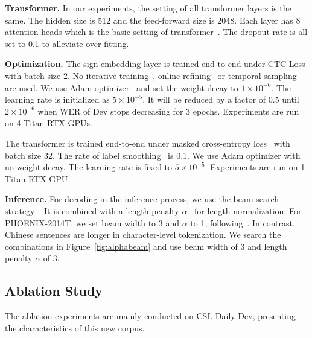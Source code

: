 \documentclass[final]{cvpr}
\begin{document}
\textbf{Transformer.}
In our experiments, the setting of all transformer layers is the same. 
The hidden size is 512 and the feed-forward size is 2048. 
Each layer has 8 attention heads which is the basic setting of transformer~\cite{vaswani2017attention}. 
The dropout rate is all set to 0.1 to alleviate over-fitting. 

\textbf{Optimization.}
The sign embedding layer is trained end-to-end under CTC Loss with batch size 2. 
No iterative training~\cite{DPD_icme19}, online refining~\cite{cslr-fcn-20fully} or temporal sampling~\cite{cslr-20-Stochastic} are used. 
We use Adam optimizer~\cite{adam} and set the weight decay to $1\times10^{-6}$. 
The learning rate is initialized as $5\times10^{-5}$. 
It will be reduced by a factor of 0.5 until $2\times10^{-6}$ when WER of Dev stops decreasing for 3 epochs. 
Experiments are run on 4 Titan RTX GPUs. 

The transformer is trained end-to-end under masked cross-entropy loss~\cite{trans-vaswani17attention} with batch size 32. 
The rate of label smoothing~\cite{labelsmooth,trans-vaswani17attention} is 0.1.  
We use Adam optimizer with no weight decay. 
The learning rate is fixed to $5\times10^{-5}$. 
Experiments are run on 1 Titan RTX GPU. 

\textbf{Inference.} 
For decoding in the inference process, we use the beam search strategy~\cite{googletranslation}. It is combined with a length penalty $\alpha$~\cite{googletranslation} for length normalization. 
For PHOENIX-2014T, we set beam width to 3 and $\alpha$ to 1, following~\cite{slt-trans-cihan20}. 
In contrast, Chinese sentences are longer in character-level tokenization. 
We search the combinations in Figure~\ref{fig:alphabeam} and use beam width of 3 and length penalty $\alpha$ of 3. 




\subsection{Ablation Study}
The ablation experiments are mainly conducted on CSL-Daily-Dev, presenting the characteristics of this new corpus. 
\end{document}
